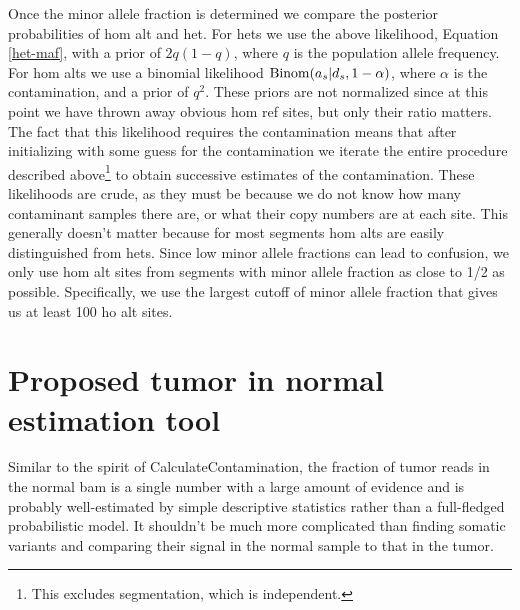 \documentclass[nofootinbib,amssymb,amsmath]{revtex4}
\begin{document}
Once the minor allele fraction is determined we compare the posterior probabilities of hom alt and het.  For hets we use the above likelihood, Equation \ref{het-maf}, with a prior of $2 q (1 - q)$, where $q$ is the population allele frequency.  For hom alts we use a binomial likelihood ${\rm Binom}(a_s | d_s, 1 - \alpha)$, where $\alpha$ is the contamination, and a prior of $q^2$.  These priors are not normalized since at this point we have thrown away obvious hom ref sites, but only their ratio matters.  The fact that this likelihood requires the contamination means that after initializing with some guess for the contamination we iterate the entire procedure described above\footnote{This excludes segmentation, which is independent.} to obtain successive estimates of the contamination.  These likelihoods are crude, as they must be because we do not know how many contaminant samples there are, or what their copy numbers are at each site.  This generally doesn't matter because for most segments hom alts are easily distinguished from hets.  Since low minor allele fractions can lead to confusion, we only use hom alt sites from segments with minor allele fraction as close to 1/2 as possible.  Specifically, we use the largest cutoff of minor allele fraction that gives us at least 100 ho alt sites.



\section{Proposed tumor in normal estimation tool}
Similar to the spirit of CalculateContamination, the fraction of tumor reads in the normal bam is a single number with a large amount of evidence and is probably well-estimated by simple descriptive statistics rather than a full-fledged probabilistic model.  It shouldn't be much more complicated than finding somatic variants and comparing their signal in the normal sample to that in the tumor.
\end{document}
